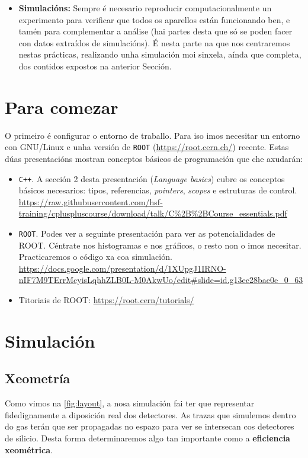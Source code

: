 \documentclass[11pt, a4paper]{article}
\begin{document}
\begin{itemize}
    \item \textbf{Simulacións:} Sempre é necesario reproducir computacionalmente un experimento para verificar que todos os aparellos están funcionando ben, e tamén para complementar a análise (hai partes desta que só se poden facer con datos extraídos de simulacións). É nesta parte na que nos centraremos nestas prácticas, realizando unha simulación moi sinxela, aínda que completa, dos contidos expostos na anterior Sección.
\end{itemize}

\section{Para comezar}
O primeiro é configurar o entorno de traballo. Para iso imos necesitar un entorno con GNU/Linux e unha versión de \verb|ROOT| (\url{https://root.cern.ch/}) recente. Estas dúas presentacións mostran conceptos básicos de programación que che axudarán:
\begin{itemize}
    \item \verb|C++|. A sección 2 desta presentación (\textit{Language basics}) cubre os conceptos básicos necesarios: tipos, referencias, \textit{pointers}, \textit{scopes} e estruturas de control. \url{https://raw.githubusercontent.com/hsf-training/cpluspluscourse/download/talk/C%2B%2BCourse_essentials.pdf}

    \item \verb|ROOT|. Podes ver a seguinte presentación para ver as potencialidades de ROOT. Céntrate nos histogramas e nos gráficos, o resto non o imos necesitar. Practicaremos o código xa coa simulación. \url{https://docs.google.com/presentation/d/1XUpgJ1IRNO-nIF7M9TErrMcyisLqhhZLB0L-M0AkwUo/edit#slide=id.g13ec28bae0e_0_63}
    \item Titoriais de ROOT: \url{https://root.cern/tutorials/}
\end{itemize}

\section{Simulación}
\subsection{Xeometría}
Como vimos na \autoref{fig:layout}, a nosa simulación fai ter que representar fidedignamente a diposición real dos detectores. As trazas que simulemos dentro do gas terán que ser propagadas no espazo para ver se intersecan cos detectores de silicio. Desta forma determinaremos algo tan importante como a \textbf{eficiencia xeométrica}.
\end{document}
